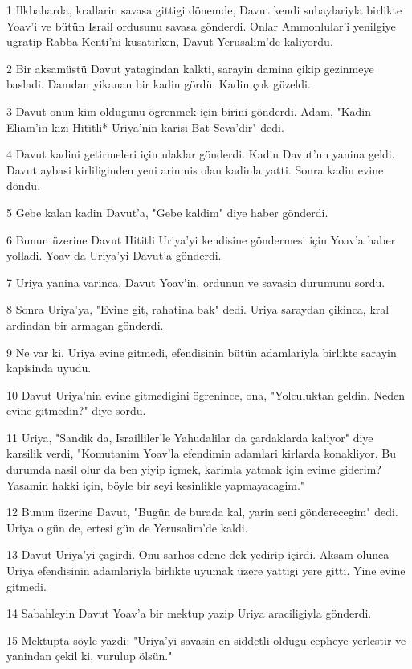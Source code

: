 \par 1 Ilkbaharda, krallarin savasa gittigi dönemde, Davut kendi subaylariyla birlikte Yoav'i ve bütün Israil ordusunu savasa gönderdi. Onlar Ammonlular'i yenilgiye ugratip Rabba Kenti'ni kusatirken, Davut Yerusalim'de kaliyordu.
\par 2 Bir aksamüstü Davut yatagindan kalkti, sarayin damina çikip gezinmeye basladi. Damdan yikanan bir kadin gördü. Kadin çok güzeldi.
\par 3 Davut onun kim oldugunu ögrenmek için birini gönderdi. Adam, "Kadin Eliam'in kizi Hititli* Uriya'nin karisi Bat-Seva'dir" dedi.
\par 4 Davut kadini getirmeleri için ulaklar gönderdi. Kadin Davut'un yanina geldi. Davut aybasi kirliliginden yeni arinmis olan kadinla yatti. Sonra kadin evine döndü.
\par 5 Gebe kalan kadin Davut'a, "Gebe kaldim" diye haber gönderdi.
\par 6 Bunun üzerine Davut Hititli Uriya'yi kendisine göndermesi için Yoav'a haber yolladi. Yoav da Uriya'yi Davut'a gönderdi.
\par 7 Uriya yanina varinca, Davut Yoav'in, ordunun ve savasin durumunu sordu.
\par 8 Sonra Uriya'ya, "Evine git, rahatina bak" dedi. Uriya saraydan çikinca, kral ardindan bir armagan gönderdi.
\par 9 Ne var ki, Uriya evine gitmedi, efendisinin bütün adamlariyla birlikte sarayin kapisinda uyudu.
\par 10 Davut Uriya'nin evine gitmedigini ögrenince, ona, "Yolculuktan geldin. Neden evine gitmedin?" diye sordu.
\par 11 Uriya, "Sandik da, Israilliler'le Yahudalilar da çardaklarda kaliyor" diye karsilik verdi, "Komutanim Yoav'la efendimin adamlari kirlarda konakliyor. Bu durumda nasil olur da ben yiyip içmek, karimla yatmak için evime giderim? Yasamin hakki için, böyle bir seyi kesinlikle yapmayacagim."
\par 12 Bunun üzerine Davut, "Bugün de burada kal, yarin seni gönderecegim" dedi. Uriya o gün de, ertesi gün de Yerusalim'de kaldi.
\par 13 Davut Uriya'yi çagirdi. Onu sarhos edene dek yedirip içirdi. Aksam olunca Uriya efendisinin adamlariyla birlikte uyumak üzere yattigi yere gitti. Yine evine gitmedi.
\par 14 Sabahleyin Davut Yoav'a bir mektup yazip Uriya araciligiyla gönderdi.
\par 15 Mektupta söyle yazdi: "Uriya'yi savasin en siddetli oldugu cepheye yerlestir ve yanindan çekil ki, vurulup ölsün."
